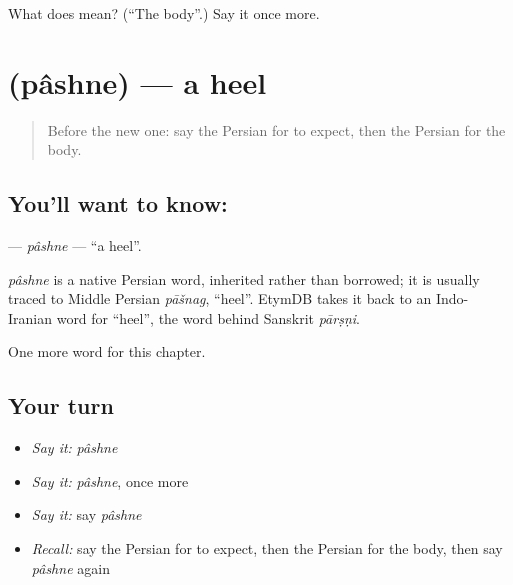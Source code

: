 \begin{tcolorbox}[breakable,colback=teal!4,colframe=teal!35!black,title={Before you move on}]
What does  mean? (\textquotedblleft{}The body\textquotedblright{}.) Say it once more.
\end{tcolorbox}
\section[\texorpdfstring{\fa{پاشنه} (pâshne)}{پاشنه (pâshne)}]{ (pâshne) — a heel}

\label{lesson:FA-C150-pashne}



\begin{quote}
Before the new one: say the Persian for to expect, then the Persian for the body.
\end{quote}

\subsection*{You'll want to know: }
\textbf{} — \emph{pâshne} — \textquotedblleft{}a heel\textquotedblright{}.

\begin{cousinweb}
\emph{pâshne} is a native Persian word, inherited rather than borrowed; it is usually traced to Middle Persian \emph{pāšnag}, \textquotedblleft{}heel\textquotedblright{}. EtymDB takes it back to an Indo-Iranian word for \textquotedblleft{}heel\textquotedblright{}, the word behind Sanskrit \emph{pārṣṇi}.
\end{cousinweb}

\begin{grammarlens}[title={What you've built}]
One more word for this chapter.
\end{grammarlens}

\subsection*{Your turn}
\begin{itemize}
\raggedright
  \item \emph{Say it:} \emph{pâshne}
  \item \emph{Say it:} \emph{pâshne}, once more
  \item \emph{Say it:} say \emph{pâshne}
  \item \emph{Recall:} say the Persian for to expect, then the Persian for the body, then say \emph{pâshne} again
\end{itemize}

